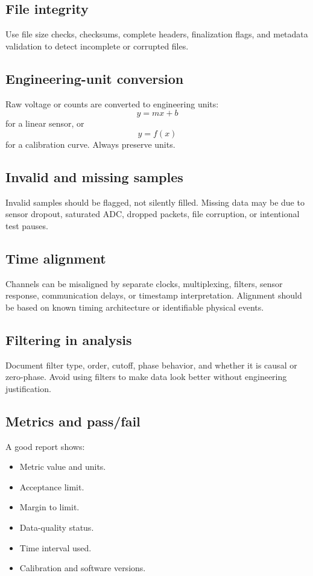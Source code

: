 \documentclass[11pt]{article}
\begin{document}
\subsection{File integrity}
Use file size checks, checksums, complete headers, finalization flags, and
metadata validation to detect incomplete or corrupted files.

\subsection{Engineering-unit conversion}
Raw voltage or counts are converted to engineering units:
\[
y = mx+b
\]
for a linear sensor, or
\[
y = f(x)
\]
for a calibration curve. Always preserve units.

\subsection{Invalid and missing samples}
Invalid samples should be flagged, not silently filled. Missing data may be due
to sensor dropout, saturated ADC, dropped packets, file corruption, or intentional
test pauses.

\subsection{Time alignment}
Channels can be misaligned by separate clocks, multiplexing, filters, sensor
response, communication delays, or timestamp interpretation. Alignment should be
based on known timing architecture or identifiable physical events.

\subsection{Filtering in analysis}
Document filter type, order, cutoff, phase behavior, and whether it is causal or
zero-phase. Avoid using filters to make data look better without engineering
justification.

\subsection{Metrics and pass/fail}
A good report shows:
\begin{itemize}
  \item Metric value and units.
  \item Acceptance limit.
  \item Margin to limit.
  \item Data-quality status.
  \item Time interval used.
  \item Calibration and software versions.
\end{itemize}
\end{document}

